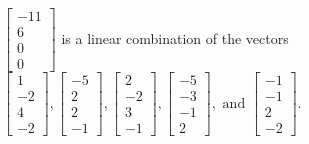 \begin{exercise}
\begin{exerciseStatement}
  \end{exerciseStatement}
  \begin{exerciseAnswer}
   \(\left[\begin{array}{c}
-11 \\
6 \\
0 \\
0
\end{array}\right]\) 
  	 is  
	a linear combination of the vectors \(\left[\begin{array}{c}
1 \\
-2 \\
4 \\
-2
\end{array}\right] , \left[\begin{array}{c}
-5 \\
2 \\
2 \\
-1
\end{array}\right] , \left[\begin{array}{c}
2 \\
-2 \\
3 \\
-1
\end{array}\right] , \left[\begin{array}{c}
-5 \\
-3 \\
-1 \\
2
\end{array}\right] , \text{ and } \left[\begin{array}{c}
-1 \\
-1 \\
2 \\
-2
\end{array}\right]\).

	
  


  \end{exerciseAnswer}
\end{exercise}